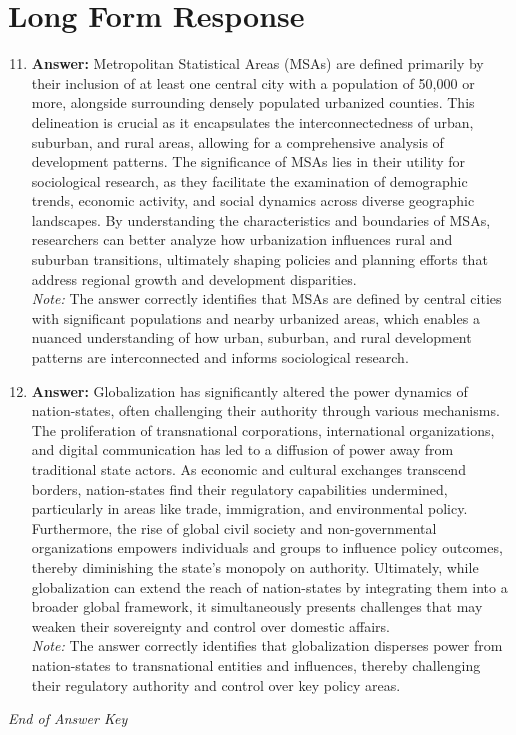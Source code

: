 \documentclass[12pt]{article}
\begin{document}
\section*{Long Form Response}
\begin{enumerate}[label=\arabic*.]
\setcounter{enumi}{10}
\item \textbf{Answer:} Metropolitan Statistical Areas (MSAs) are defined primarily by their inclusion of at least one central city with a population of 50,000 or more, alongside surrounding densely populated urbanized counties. This delineation is crucial as it encapsulates the interconnectedness of urban, suburban, and rural areas, allowing for a comprehensive analysis of development patterns. The significance of MSAs lies in their utility for sociological research, as they facilitate the examination of demographic trends, economic activity, and social dynamics across diverse geographic landscapes. By understanding the characteristics and boundaries of MSAs, researchers can better analyze how urbanization influences rural and suburban transitions, ultimately shaping policies and planning efforts that address regional growth and development disparities.
\\ \textit{Note:} The answer correctly identifies that MSAs are defined by central cities with significant populations and nearby urbanized areas, which enables a nuanced understanding of how urban, suburban, and rural development patterns are interconnected and informs sociological research.
\item \textbf{Answer:} Globalization has significantly altered the power dynamics of nation-states, often challenging their authority through various mechanisms. The proliferation of transnational corporations, international organizations, and digital communication has led to a diffusion of power away from traditional state actors. As economic and cultural exchanges transcend borders, nation-states find their regulatory capabilities undermined, particularly in areas like trade, immigration, and environmental policy. Furthermore, the rise of global civil society and non-governmental organizations empowers individuals and groups to influence policy outcomes, thereby diminishing the state's monopoly on authority. Ultimately, while globalization can extend the reach of nation-states by integrating them into a broader global framework, it simultaneously presents challenges that may weaken their sovereignty and control over domestic affairs.
\\ \textit{Note:} The answer correctly identifies that globalization disperses power from nation-states to transnational entities and influences, thereby challenging their regulatory authority and control over key policy areas.
\end{enumerate}

\vfill
\noindent\textit{End of Answer Key}
\end{document}

